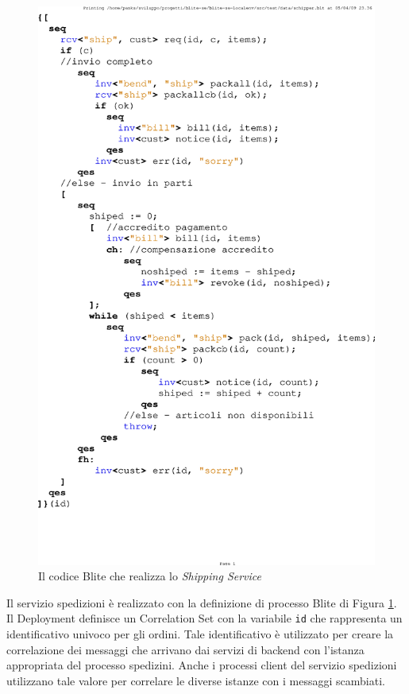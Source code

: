\begin{figure}[tp]
\begin{center}
  \includegraphics[scale=0.80,clip]{blide/dia/shipper}
   \caption[Codice Blite, il Servizio Spedizioni]{Il codice Blite che realizza
   lo
   \emph{Shipping Service}}
  \label{fig:shipper}
\end{center}
\end{figure}

Il servizio spedizioni è realizzato con la definizione di processo Blite di
Figura \ref{fig:shipper}. Il Deployment definisce un Correlation Set con la
variabile \texttt{id} che rappresenta un identificativo univoco per gli ordini.
Tale identificativo è utilizzato per creare la correlazione dei messaggi che
arrivano dai servizi di backend con l'istanza appropriata del processo
spedizini. Anche i processi client del servizio spedizioni utilizzano tale valore per
correlare le diverse istanze con i messaggi scambiati.

